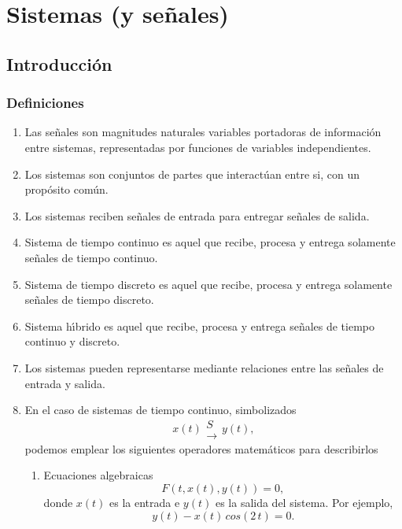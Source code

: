 \chapter{Sistemas (y se\~{n}ales)}

\section{Introducci\'{o}n}

\subsection{Definiciones}

\begin{enumerate}
\item Las se\~{n}ales son magnitudes naturales variables portadoras
  de informaci\'{o}n entre sistemas, representadas por funciones de
  variables independientes.

\item Los sistemas son conjuntos de partes que interact\'{u}an entre
  si, con un prop\'{o}sito com\'{u}n.

\item Los sistemas reciben se\~{n}ales de entrada para entregar
  se\~{n}ales de salida.

\item Sistema de tiempo continuo es aquel que recibe, procesa y
  entrega solamente se\~{n}ales de tiempo continuo.

\item Sistema de tiempo discreto es aquel que recibe, procesa y entrega
  solamente se\~{n}ales de tiempo discreto.

\item Sistema h\'{\i}brido es aquel que recibe, procesa y entrega se\~{n}ales
  de tiempo continuo y discreto.

\item Los sistemas pueden representarse mediante relaciones entre las
  se\~{n}ales de entrada y salida.

\item En el caso de sistemas de tiempo continuo, simbolizados
    \begin{equation}
      x(t) 
      \begin{array}{l}
        S               \\ 
        \rightarrow
      \end{array}
      y(t),
    \end{equation}
    podemos emplear los siguientes operadores matem\'{a}ticos para describirlos
    \begin{enumerate}
    \item Ecuaciones algebraicas
      \begin{equation}
        F(t, x(t), y(t)) = 0,
      \end{equation}
      donde $x(t)$ es la entrada e $y(t)$ es la salida del sistema. Por ejemplo,
      \begin{equation}
         y(t) - x(t) \, cos(2 \, t) = 0.
      \end{equation}
                                

\end{enumerate}
\end{enumerate}
